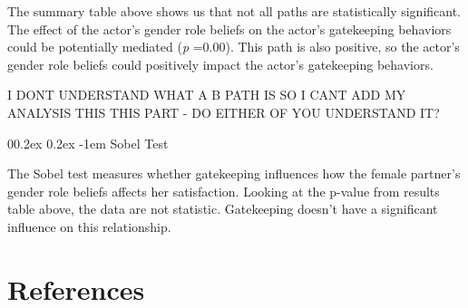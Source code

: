 \documentclass[
  man,floatsintext]{apa6}
\makeatletter
\let\oldparagraph\paragraph
\renewcommand{\paragraph}[1]{\oldparagraph{#1}\mbox{}}
\newlength{\cslhangindent}
\newlength{\cslentryspacingunit} %
\newenvironment{CSLReferences}[2] %
 {%
  \setlength{\parindent}{0pt}
  \ifodd #1
  \let\oldpar\par
  \def\par{\hangindent=\cslhangindent\oldpar}
  \fi
  \setlength{\parskip}{#2\cslentryspacingunit}
 }%
 {}
\renewcommand{\paragraph}{\@startsection{paragraph}{4}{\parindent}%
  {0\baselineskip \@plus 0.2ex \@minus 0.2ex}%
  {-1em}%
  {\normalfont\normalsize\bfseries\itshape\typesectitle}}
\makeatother
\begin{document}
The summary table above shows us that not all paths are statistically significant. The effect of the actor's gender role beliefs on the actor's gatekeeping behaviors could be potentially mediated (\emph{p} =0.00). This path is also positive, so the actor's gender role beliefs could positively impact the actor's gatekeeping behaviors.

I DONT UNDERSTAND WHAT A B PATH IS SO I CANT ADD MY ANALYSIS THIS THIS PART - DO EITHER OF YOU UNDERSTAND IT?

\hypertarget{sobel-test}{%
\paragraph{Sobel Test}\label{sobel-test}}

The Sobel test measures whether gatekeeping influences how the female partner's gender role beliefs affects her satisfaction. Looking at the p-value from results table above, the data are not statistic. Gatekeeping doesn't have a significant influence on this relationship.

\hypertarget{references}{%
\section{References}\label{references}}

\hypertarget{refs}{}
\begin{CSLReferences}{0}{0}
\end{CSLReferences}


\clearpage
\renewcommand{\listfigurename}{Figure captions}

\clearpage
\renewcommand{\listtablename}{Table captions}
\end{document}
